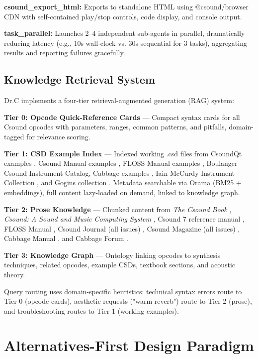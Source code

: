 \documentclass[a4paper]{article}
\begin{document}
\textbf{csound\_export\_html:} Exports to standalone HTML using @csound/browser CDN with self-contained play/stop controls, code display, and console output.

\textbf{task\_parallel:} Launches 2--4 independent sub-agents in parallel, dramatically reducing latency (e.g., 10s wall-clock vs. 30s sequential for 3 tasks), aggregating results and reporting failures gracefully.

\subsection{Knowledge Retrieval System}

Dr.C implements a four-tier retrieval-augmented generation (RAG) system:

\textbf{Tier 0: Opcode Quick-Reference Cards} — Compact syntax cards for all Csound opcodes with parameters, ranges, common patterns, and pitfalls, domain-tagged for relevance scoring.

\textbf{Tier 1: CSD Example Index} — Indexed working .csd files from CsoundQt examples \cite{csoundqt}, Csound Manual examples \cite{csoundmanual}, FLOSS Manual examples \cite{flossexamples}, Boulanger Csound Instrument Catalog, Cabbage examples \cite{cabbagemanual}, Iain McCurdy Instrument Collection \cite{mccurdycollection}, and Gogins collection \cite{goginscollection}. Metadata searchable via Orama (BM25 + embeddings), full content lazy-loaded on demand, linked to knowledge graph.

\textbf{Tier 2: Prose Knowledge} — Chunked content from \textit{The Csound Book} \cite{boulanger2000csound}, \textit{Csound: A Sound and Music Computing System} \cite{lazzarini2016csound}, Csound 7 reference manual \cite{csoundmanual}, FLOSS Manual \cite{flossmanual}, Csound Journal (all issues) \cite{csoundjournal}, Csound Magazine (all issues) \cite{csoundezine}, Cabbage Manual \cite{cabbagemanual}, and Cabbage Forum \cite{cabbageforum}.

\textbf{Tier 3: Knowledge Graph} — Ontology linking opcodes to synthesis techniques, related opcodes, example CSDs, textbook sections, and acoustic theory.

Query routing uses domain-specific heuristics: technical syntax errors route to Tier 0 (opcode cards), aesthetic requests ("warm reverb") route to Tier 2 (prose), and troubleshooting routes to Tier 1 (working examples).

\section{Alternatives-First Design Paradigm}
\label{sec:alternatives}
\end{document}
